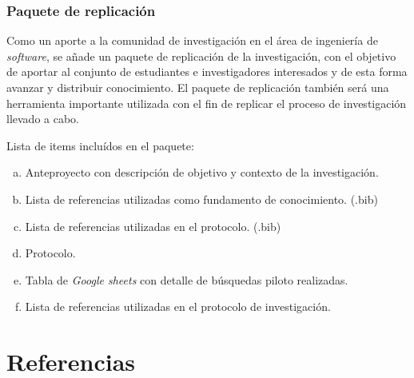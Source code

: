 \documentclass{article}
\begin{document}
\subsubsection{Paquete de replicación}
Como un aporte a la comunidad de investigación en el área de ingeniería de \emph{software}, 
se añade un paquete de replicación de la investigación, con el objetivo de aportar  
al conjunto de estudiantes e investigadores interesados y de esta forma avanzar y distribuir 
conocimiento.
El paquete de replicación también será una herramienta importante utilizada con el fin de replicar 
el proceso de investigación llevado a cabo.

Lista de items incluídos en el paquete: 
  \begin{enumerate}[(a)]
  \item Anteproyecto con descripción de objetivo y contexto de la investigación. 
  \item Lista de referencias utilizadas como fundamento de conocimiento. (.bib)
  \item Lista de referencias utilizadas en el protocolo.  (.bib)
  \item Protocolo.
  \item Tabla de \emph{Google sheets} con detalle de búsquedas piloto realizadas. 
  \item Lista de referencias utilizadas en el protocolo de investigación.
  \end{enumerate}
\newpage

\section{Referencias}
\end{document}
